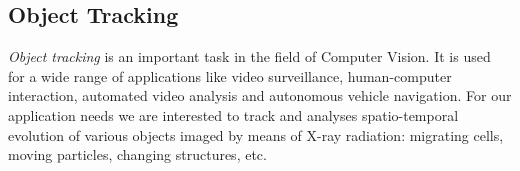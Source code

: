 %
%
%
%
%
%
%
%
       

\subsection{Object Tracking}
\label{tracking}


\textit{Object tracking} is an important task in the field of Computer Vision. It is used for a wide range of applications like video surveillance, human-computer
interaction, automated video analysis and autonomous vehicle navigation. For our application needs we are interested to track and analyses spatio-temporal evolution of various objects imaged by means of X-ray radiation: migrating cells, moving particles, changing structures, etc.


